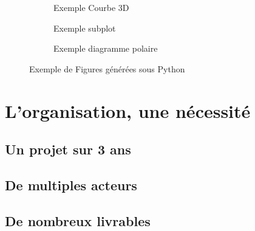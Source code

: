 \documentclass[a4paper,12pt]{report}
\begin{document}
\begin{figure}[hbtp]
	\centering
	\begin{subfigure}[b]{0.5\textwidth}
		\centering
		\def\svgwidth{\columnwidth}
		\fontsize{10pt}{10pt}\selectfont
		\caption{Exemple Courbe 3D} 
		\label{figure_courbe_3D}
	\end{subfigure}
	\qquad
	\begin{subfigure}[b]{0.5\textwidth}
		\centering
		\def\svgwidth{\columnwidth}
		\fontsize{10pt}{10pt}\selectfont
		\caption{Exemple subplot} 
		\label{figure_subplot}
	\end{subfigure}
	\qquad
	\begin{subfigure}[b]{0.5\textwidth}
		\centering
		\def\svgwidth{\columnwidth}
		\fontsize{10pt}{10pt}\selectfont
		\caption{Exemple diagramme polaire} 
		\label{figure_polaire}
	\end{subfigure}
	\caption{Exemple de Figures générées sous Python} 
	\label{figure_exemples_python}
\end{figure}



\FloatBarrier
\newpage
\section{L'organisation, une nécessité}
\subsection{Un projet sur 3 ans}



\FloatBarrier
\subsection{De multiples acteurs}



\FloatBarrier
\subsection{De nombreux livrables}




\FloatBarrier
\end{document}
